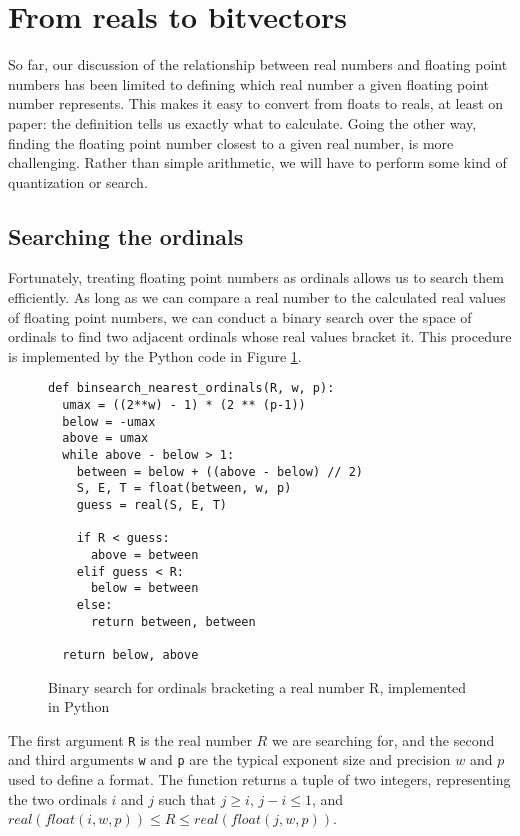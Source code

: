 \documentclass[letterpaper,10pt]{article}
\begin{document}
\section{From reals to bitvectors}

So far, our discussion of the relationship between real numbers and floating point numbers has been limited to defining which real number a given floating point number represents. This makes it easy to convert from floats to reals, at least on paper: the definition tells us exactly what to calculate. Going the other way, finding the floating point number closest to a given real number, is more challenging. Rather than simple arithmetic, we will have to perform some kind of quantization or search.

\subsection{Searching the ordinals}

Fortunately, treating floating point numbers as ordinals allows us to search them efficiently. As long as we can compare a real number to the calculated real values of floating point numbers, we can conduct a binary search over the space of ordinals to find two adjacent ordinals whose real values bracket it. This procedure is implemented by the Python code in Figure \ref{fig:binsearch}.

\begin{figure}[t!]
\label{fig:binsearch}
\caption{Binary search for ordinals bracketing a real number R, implemented in Python}
\begin{verbatim}
def binsearch_nearest_ordinals(R, w, p):
  umax = ((2**w) - 1) * (2 ** (p-1))
  below = -umax
  above = umax
  while above - below > 1:
    between = below + ((above - below) // 2)
    S, E, T = float(between, w, p)
    guess = real(S, E, T)
    
    if R < guess:
      above = between
    elif guess < R:
      below = between
    else:
      return between, between
      
  return below, above  
\end{verbatim}
\end{figure}

The first argument \texttt{R} is the real number $R$ we are searching for, and the second and third arguments \texttt{w} and \texttt{p} are the typical exponent size and precision $w$ and $p$ used to define a format. The function returns a tuple of two integers, representing the two ordinals $i$ and $j$ such that $j \geq i$, $j-i \leq 1$, and $real(float(i, w, p)) \leq R \leq real(float(j, w, p))$.
\end{document}
